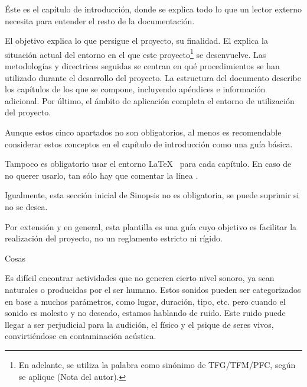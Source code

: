 
\minitoc

\begin{sinopsis}
\label{sec:intro:sinop}
	Éste es el capítulo de introducción, donde se explica todo lo que un lector externo necesita para entender el resto de la documentación.
	
	El objetivo explica lo que persigue el proyecto, su finalidad.\nli
	El  explica la situación actual del entorno en el que este proyecto\footnote{En adelante, se utiliza la palabra  como sinónimo de TFG/TFM/PFC, según se aplique (Nota del autor).} se desenvuelve.\nli
	Las metodologías y directrices seguidas se centran en qué procedimientos se han utilizado durante el desarrollo del proyecto.\nli
	La estructura del documento describe los capítulos de los que se compone, incluyendo apéndices e información adicional.\nli
	Por último, el ámbito de aplicación completa el entorno de utilización del proyecto.
	
	Aunque estos cinco apartados no son obligatorios, al menos es recomendable considerar estos conceptos en el capítulo de introducción como una guía básica.
	
	Tampoco es obligatorio usar el entorno \LaTeX\  para cada capítulo.\nli
	En caso de no querer usarlo, tan sólo hay que comentar la línea .
	
	Igualmente, esta sección inicial de Sinopsis no es obligatoria, se puede suprimir si no se desea.
	
	Por extensión y en general, esta plantilla es una guía cuyo objetivo es facilitar la realización del proyecto, no un reglamento estricto ni rígido.
\end{sinopsis}
 
\label{sec:intro:obj}
Cosas

    Es difícil encontrar actividades que no generen cierto nivel sonoro, ya sean naturales o producidas por el ser humano. Estos sonidos pueden ser categorizados en base a muchos parámetros, como lugar, duración, tipo, etc. pero cuando el sonido es molesto y no deseado, estamos hablando de ruido. Este ruido puede llegar a ser perjudicial para la audición, el físico y el psique de seres vivos, convirtiéndose en contaminación acústica.
    
